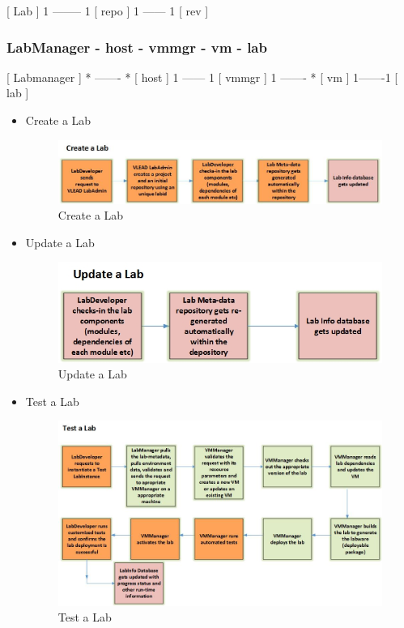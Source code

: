 \documentclass[11pt]{article}
\begin{document}
 [ Lab ] 1 -------- 1 [ repo ] 1 ------ 1 [ rev ]

\subsubsection{LabManager - host - vmmgr - vm - lab}
\label{sec-3.3.3}


 [ Labmanager ] * ------- * [ host ] 1 ------ 1 [ vmmgr ] 1 ------- * [ vm ] 1-------1 [ lab ]

\begin{itemize}

\item Create a Lab\\
\label{sec-3.4.1}


\begin{figure}[htb]
\centering
\includegraphics[width=16cm]{Create-a-Lab.jpg}
\caption{Create a Lab}
\end{figure}


\item Update a Lab\\
\label{sec-3.4.2}


\begin{figure}[htb]
\centering
\includegraphics[width=12cm]{Update-a-lab.jpg}
\caption{Update a Lab}
\end{figure}


\item Test a Lab\\
\label{sec-3.4.3}


\begin{figure}[htb]
\centering
\includegraphics[width=16cm]{Test-a-lab.jpg}
\caption{Test a Lab}
\end{figure}



\end{itemize}
\end{document}
